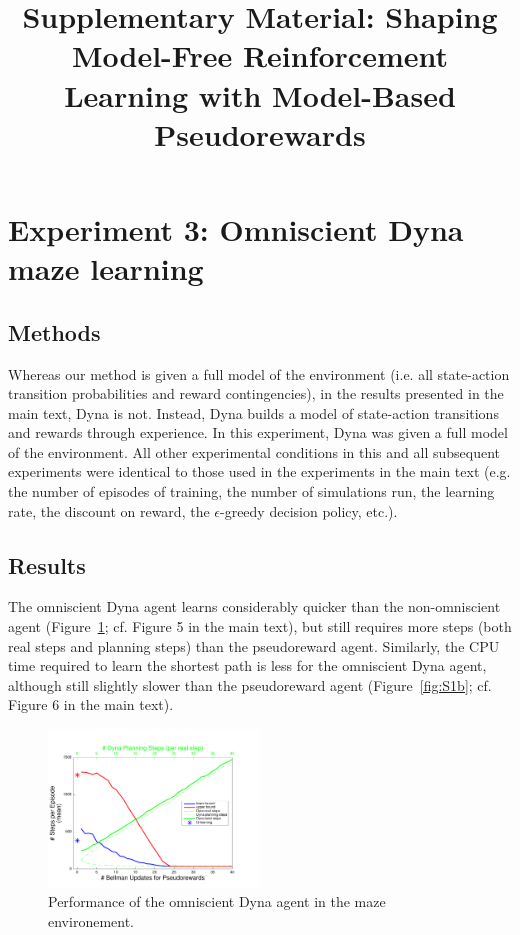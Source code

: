 \documentclass[letterpaper]{article}
\begin{document}
%

\title{Supplementary Material: Shaping Model-Free Reinforcement Learning with Model-Based Pseudorewards}
\date{}
\maketitle

\pagebreak

\section{Experiment 3: Omniscient Dyna maze learning}

\subsection{Methods}

Whereas our method is given a full model of the environment (i.e. all state-action transition probabilities and reward contingencies), in the results presented in the main text, Dyna is not. Instead, Dyna builds a model of state-action transitions and rewards through experience. In this experiment, Dyna was given a full model of the environment. All other experimental conditions in this and all subsequent experiments were identical to those used in the experiments in the main text (e.g. the number of episodes of training, the number of simulations run, the learning rate, the discount on reward, the $\epsilon$-greedy decision policy, etc.).

\subsection{Results}

The omniscient Dyna agent learns considerably quicker than the non-omniscient agent (Figure~\ref{fig:S1a}; cf. Figure 5 in the main text), but still requires more steps (both real steps and planning steps) than the pseudoreward agent. Similarly, the CPU time required to learn the shortest path is less for the omniscient Dyna agent, although still slightly slower than the pseudoreward agent (Figure~\ref{fig:S1b}; cf. Figure 6 in the main text).


\begin{figure}[ht]
\centering
\includegraphics[width=0.5\textwidth]{learning_vs_PRiterations_omniscientDYNA_mean}
\caption{Performance of the omniscient Dyna agent in the maze environement.}
\label{fig:S1a}
\end{figure}
\end{document}
